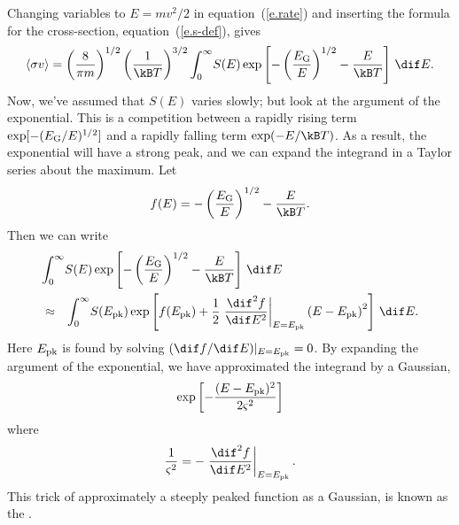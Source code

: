 \begin{sidebar}
Changing variables to $E = mv^{2}/2$ in equation~(\ref{e.rate}) and inserting the formula for the cross-section, equation~(\ref{e.s-def}), gives
\begin{equation}\label{e.integral}
\langle\sigma v\rangle = \left(\frac{8}{\pi m}\right)^{1/2}\left(\frac{1}{\kB T}\right)^{3/2}\int_{0}^{\infty}\!S(E)\exp\left[-\left(\frac{\EG}{E}\right)^{1/2}-\frac{E}{\kB T}\right]\,\dif E.
\end{equation}
Now, we've assumed that $S(E)$ varies slowly; but look at the argument of the exponential. This is a competition between a rapidly rising term $\exp[-(E_{\mathrm{G}}/E)^{1/2}]$ and a rapidly falling term $\exp(-E/\kB T)$. As a result, the exponential will have a strong peak, and we can expand the integrand in a Taylor series about the maximum. Let 
\[
f(E) = -\left(\frac{\EG}{E}\right)^{1/2} - \frac{E}{\kB T}.
\]
Then we can write 
\begin{eqnarray*}
\lefteqn{\int_{0}^{\infty}\!S(E)\exp\left[-\left(\frac{\EG}{E}\right)^{1/2}-\frac{E}{\kB T}\right]\,\dif E}\\
&\approx&
	\int_{0}^{\infty}\! S(\Epk)\exp\left[f(\Epk) + \frac{1}{2}\left.\frac{\dif^{2} f}{\dif E^{2}}\right|_{E=\Epk}\left(E-\Epk\right)^{2}\right]\,\dif E.
\end{eqnarray*}
Here $E_{\mathrm{pk}}$ is found by solving $(\dif f/\dif E)|_{E=\Epk} = 0$. By expanding the argument of the exponential, we have approximated the integrand by a Gaussian,
\[
	\exp\left[-\frac{(E-E_{\mathrm{pk}})^{2}}{2\varsigma^{2}}\right]
\]
where
\[
	\frac{1}{\varsigma^{2}} = -\left.\frac{\dif^{2} f}{\dif E^{2}}\right|_{E=\Epk}.
\]
This trick of approximately a steeply peaked function as a Gaussian, is known as the .


\end{sidebar}
